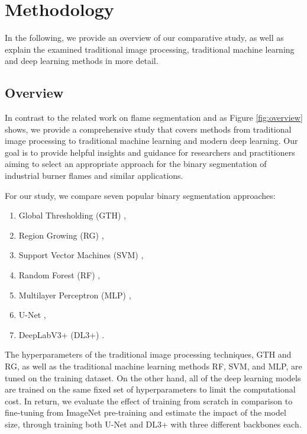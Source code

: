 \documentclass{isprs} %
\begin{document}

\section{Methodology}\label{Methodology}
In the following, we provide an overview of our comparative study, as well as explain the examined traditional image processing, traditional machine learning and deep learning methods in more detail. 

\subsection{Overview}
In contrast to the related work on flame segmentation and as Figure \ref{fig:overview} shows, we provide a comprehensive study that covers methods from traditional image processing to traditional machine learning and modern deep learning. Our goal is to provide helpful insights and guidance for researchers and practitioners aiming to select an appropriate approach for the binary segmentation of industrial burner flames and similar applications.  

For our study, we compare seven popular binary segmentation approaches:
\begin{enumerate}
    \item Global Thresholding (GTH) \citep{lee1990comparative},
    \item Region Growing (RG) \citep{adams1994seeded},
    \item Support Vector Machines (SVM) \citep{hearst1998support},
    \item Random Forest (RF) \citep{breiman2001random},
    \item Multilayer Perceptron (MLP) \citep{mcclelland1987parallel},
    \item U-Net \citep{ronneberger2015u},
    \item DeepLabV3+ (DL3+) \citep{chen2018EncoderDecoderAtrous}.
\end{enumerate}

The hyperparameters of the traditional image processing techniques, GTH and RG, as well as the traditional machine learning methods RF, SVM, and MLP, are tuned on the training dataset. On the other hand, all of the deep learning models are trained on the same fixed set of hyperparameters to limit the computational cost. In return, we evaluate the effect of training from scratch in comparison to fine-tuning from ImageNet pre-training and estimate the impact of the model size, through training both U-Net and DL3+ with three different backbones each. 
\end{document}
